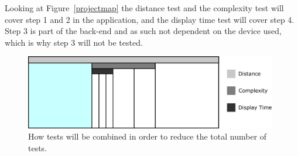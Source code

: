 Looking at Figure~\ref{projectmap} the distance test and the complexity test will cover step 1 and 2 in the application, and the display time test will cover step 4. Step 3 is part of the back-end and as such not dependent on the device used, which is why step 3 will not be tested.

	\begin{figure}[H]%
		\centering
		\includegraphics[width=110mm]{images/testCombination}
		\caption{How tests will be combined in order to reduce the total number of tests.}
		\label{testCombination}
	\end{figure}





















